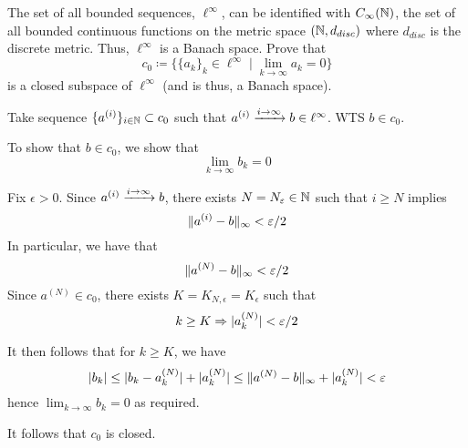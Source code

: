 \documentclass[a4paper, 10pt]{article}
\begin{document}
\begin{problem} [\done]
    The set of all bounded sequences, $\ell^{\infty}$, can be identified with $C_{\infty}(\mathbb{N})$, the set of all bounded continuous functions on the metric space $(\mathbb{N}, d_{disc})$    where $d_{disc}$    is the discrete metric. Thus, $\ell^{\infty}$ is a Banach space. Prove that \begin{equation*}
    c_0 \coloneqq \{\{a_k\}_{k} \in \ell^{\infty} \mid \lim_{k \to \infty} a_k =0\} 
    \end{equation*}
    is a closed subspace of $\ell^{\infty}$ (and is thus, a Banach space).
\end{problem}
\begin{solution}
    Take sequence $\{a^{(i)} \}_{i \in \mathbb{N}} \subset c_0$ such that $a^{(i)} \xrightarrow{i \to \infty} b \in \ell^{\infty}$. WTS $b \in c_0$.

    To show that $b \in c_0$, we show that 
    \begin{equation*}
    \lim_{k \to \infty} b_k = 0
    \end{equation*}

    Fix $\epsilon > 0$. Since $a^{(i)} \xrightarrow{i \to \infty} b$, there exists $N = N_\varepsilon \in \mathbb{N}$ such that $i \geq N$ implies \begin{equation*}
    \lVert a^{(i)} - b\rVert_\infty < \varepsilon/2
    \end{equation*}
    In particular, we have that \begin{equation*}
        \lVert a^{(N)} - b\rVert_\infty < \varepsilon/2
    \end{equation*}
    Since $a^{(N)} \in c_0$, there exists $K = K_{N, \epsilon} = K_\epsilon$ such that \begin{equation*}
    k \geq K \Rightarrow \lvert a^{(N)}_k\rvert < \varepsilon/2
    \end{equation*}

    It then follows that for $k \geq K$, we have \begin{equation*}
    \lvert b_k\rvert \leq \lvert b_k - a^{(N)}_k\rvert + \lvert a^{(N)}_k\rvert \leq \lVert a^{(N)} - b\rVert_\infty + \lvert a^{(N)}_k\rvert < \varepsilon
    \end{equation*}
    hence $\lim_{ k \to \infty} b_k = 0$ as required.

    It follows that $c_0$ is closed.
\end{solution}
\end{document}
